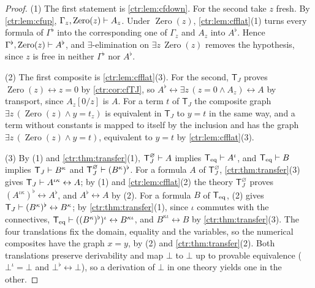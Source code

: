 \begin{proof}
(1) The first statement is \cref{ctr:lem:cfdown}. For the second take $z$ fresh. By
\cref{ctr:lem:cfup}, $\Gamma_z,\operatorname{Zero}(z)\vdash A_z$. Under
$\operatorname{Zero}(z)$, \cref{ctr:lem:cfflat}(1) turns every formula of $\Gamma^\flat$ into
the corresponding one of $\Gamma_z$ and $A_z$ into $A^\flat$. Hence
$\Gamma^\flat,\operatorname{Zero}(z)\vdash A^\flat$, and $\exists$-elimination on
$\exists z\,\operatorname{Zero}(z)$ removes the hypothesis, since $z$ is free in neither
$\Gamma^\flat$ nor $A^\flat$.

(2) The first composite is \cref{ctr:lem:cfflat}(3). For the second, $\mathsf T_J$ proves
$\operatorname{Zero}(z)\leftrightarrow z=0$ by \cref{ctr:cor:cfTJ}, so
$A^\flat\leftrightarrow\exists z\,(z=0\land A_z)\leftrightarrow A$ by transport, since
$A_z[0/z]$ is $A$. For a term $t$ of $\mathsf T_J$ the composite graph
$\exists z\,(\operatorname{Zero}(z)\land y=t_z)$ is equivalent in $\mathsf T_J$ to $y=t$ in
the same way, and a term without constants is mapped to itself by the inclusion and has the
graph $\exists z\,(\operatorname{Zero}(z)\land y=t)$, equivalent to $y=t$ by
\cref{ctr:lem:cfflat}(3).

(3) By (1) and \cref{ctr:thm:transfer}(1), $\mathsf T_J^{\varnothing}\vdash A$ implies
$\mathsf{T}_{\mathrm{eq}}\vdash A^\iota$, and $\mathsf{T}_{\mathrm{eq}}\vdash B$ implies $\mathsf T_J\vdash B^\kappa$ and
$\mathsf T_J^{\varnothing}\vdash(B^\kappa)^\flat$. For a formula $A$ of
$\mathsf T_J^{\varnothing}$, \cref{ctr:thm:transfer}(3) gives
$\mathsf T_J\vdash A^{\iota\kappa}\leftrightarrow A$; by (1) and \cref{ctr:lem:cfflat}(2)
the theory $\mathsf T_J^{\varnothing}$ proves $(A^{\iota\kappa})^\flat\leftrightarrow A^\flat$,
and $A^\flat\leftrightarrow A$ by (2). For a formula $B$ of $\mathsf{T}_{\mathrm{eq}}$, (2) gives
$\mathsf T_J\vdash(B^\kappa)^\flat\leftrightarrow B^\kappa$; by
\cref{ctr:thm:transfer}(1), since $\iota$ commutes with the connectives,
$\mathsf{T}_{\mathrm{eq}}\vdash((B^\kappa)^\flat)^\iota\leftrightarrow B^{\kappa\iota}$, and
$B^{\kappa\iota}\leftrightarrow B$ by \cref{ctr:thm:transfer}(3). The four translations fix
the domain, equality and the variables, so the numerical composites have the graph $x=y$,
by (2) and \cref{ctr:thm:transfer}(2). Both translations preserve derivability and map
$\bot$ to $\bot$ up to provable equivalence ($\bot^\iota=\bot$ and
$\bot^\flat\leftrightarrow\bot$), so a derivation of $\bot$ in one theory yields one in the
other.
\end{proof}

